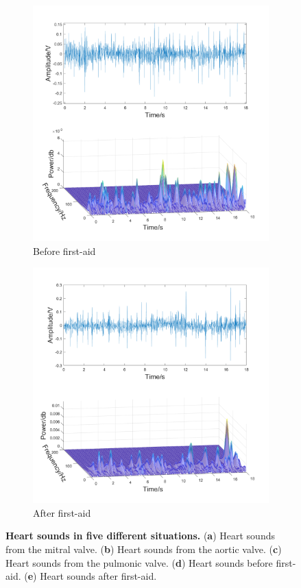 \begin{figure}[htbp]
\begin{subfigure}{.45\linewidth}
        \includegraphics[width=1\linewidth]{figs/disscussion/d.png}
        \caption{Before first-aid}
        \label{FIG:Time&Frequency.d}
    \end{subfigure}\hfill
    \begin{subfigure}{.45\linewidth}
        \centering
        \includegraphics[width=1\linewidth]{figs/disscussion/e.png}
        \caption{After first-aid}
        \label{FIG:Time&Frequency.e}
    \end{subfigure}
\caption{\textbf{Heart sounds in five different situations.} (\textbf{a}) Heart sounds from the mitral valve. (\textbf{b}) Heart sounds from the aortic valve. (\textbf{c}) Heart sounds from the pulmonic valve. (\textbf{d}) Heart sounds before first-aid. (\textbf{e}) Heart sounds after first-aid.}
\label{FIG:Time&Frequency}
\end{figure}
